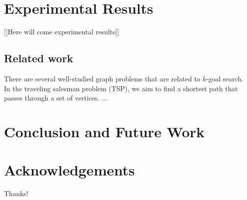 \documentclass{aicom2e}
\begin{document}
\section{Experimental Results}
[[Here will come experimental results]]

\subsection*{Related work}

There are several well-studied graph problems that are related to $k$-goal search. In the traveling salesman problem (TSP), we aim to find a shortest path that passes through a set of vertices. 
...

\section{Conclusion and Future Work}


\section*{Acknowledgements}
Thanks!



\end{document}
